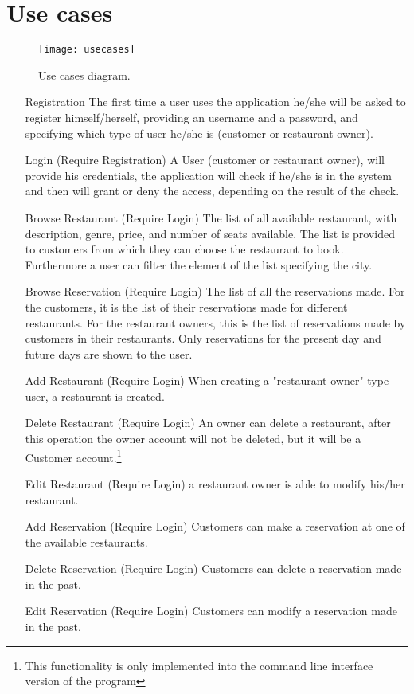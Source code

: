 \section{Use cases}

\begin{figure}[ht]
	\texttt{[image: usecases]}
	\caption{Use cases diagram.}
	\label{fig:usecases}
\end{figure}

\begin{itemize}
	\item[Registration] The first time a user uses the application  he/she
		will be asked to register himself/herself, providing an username
		and a password, and specifying which type of user he/she is
		(customer or restaurant owner).
	\item[Login] (Require Registration) A User (customer or restaurant
		owner), will provide his credentials, the application will check
		if he/she is in the system and then will grant or deny the
		access, depending on the result of the check.
	\item[Browse Restaurant] (Require Login) The list of all available
		restaurant, with description, genre, price, and number of seats
		available. The list is provided to customers from which they
		can choose the restaurant to book. Furthermore a user can filter
		the element of the list specifying the city.
	\item[Browse Reservation] (Require Login) The list of all the
		reservations made. For the customers, it is the list of their
		reservations made for different restaurants. For the restaurant
		owners, this is the list of reservations made by customers in
		their restaurants. Only reservations for the present day and
		future days are shown to the user.
	\item[Add Restaurant] (Require Login) When creating a "restaurant owner"
		type user, a restaurant is created.
	\item [Delete Restaurant] (Require Login) An owner can delete a
		restaurant, after this operation the owner account will not be
		deleted, but it will be a Customer account.\footnote{This
		functionality is only implemented into the command line
		interface version of the program}
	\item[Edit Restaurant] (Require Login) a restaurant owner is able to
		modify his/her restaurant.
	\item[Add Reservation] (Require Login) Customers can make a reservation
		at one of the available restaurants.
	\item[Delete Reservation] (Require Login) Customers can delete a
		reservation made in the past.
	\item[Edit Reservation] (Require Login) Customers can modify a
		reservation made in the past.
\end{itemize}
